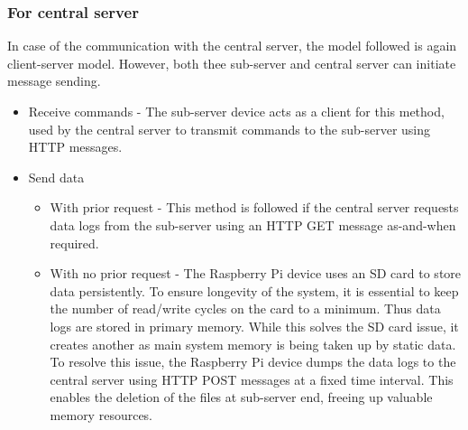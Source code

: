 \documentclass[letterpaper,11pt]{report}
\begin{document}
\subsubsection{For central server}
In case of the communication with the central server, the model followed is again client-server model. However, both thee sub-server and central server can initiate message sending.
\begin{itemize}
    \item Receive commands - The sub-server device acts as a client for this method, used by the central server to transmit commands to the sub-server using HTTP messages.
    \item Send data
    \begin{itemize}
        \item With prior request - This method is followed if the central server requests data logs from the sub-server using an HTTP GET message as-and-when required.
        \item With no prior request - The Raspberry Pi device uses an SD card to store data persistently. To ensure longevity of the system, it is essential to keep the number of read/write cycles on the card to a minimum. Thus data logs are stored in primary memory. While this solves the SD card issue, it creates another as main system memory is being taken up by static data. To resolve this issue, the Raspberry Pi device dumps the data logs to the central server using HTTP POST messages at a fixed time interval. This enables the deletion of the files at sub-server end, freeing up valuable memory resources.
    \end{itemize}
\end{itemize}

%

%
%


\end{document}

